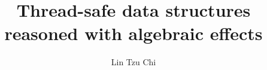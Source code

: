 \documentclass{beamer}
\begin{document}
\title{Thread-safe data structures reasoned with algebraic effects}
\author{Lin Tzu Chi}

\frame{\titlepage}

\begin{frame}{}
\end{frame}

\end{document}
